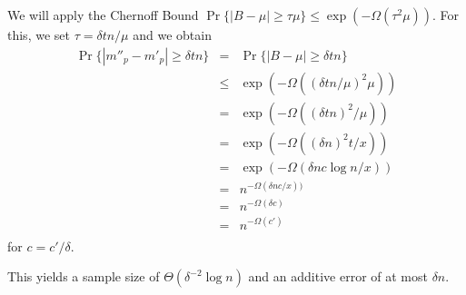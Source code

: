 \documentclass{patmorin}
\begin{document}
We will apply the Chernoff Bound $\Pr\{|B-\mu| \ge \tau\mu\} \le
\exp(-\Omega(\tau^2\mu))$.  For this, we set $\tau = \delta t n/\mu$ and we
obtain
\begin{eqnarray*}
   \Pr\{ |m''_p - m'_p| \ge \delta tn \} 
   & = & \Pr\{ |B-\mu| \ge \delta t n \} \\
   & \le & \exp(-\Omega(\left(\delta t n /\mu\right)^2 \mu)) \\
   &  = & \exp(-\Omega((\delta t n)^2/\mu)) \\
   &  = & \exp(-\Omega((\delta n)^2t/x)) \\
   &  = & \exp(-\Omega(\delta nc\log n/x)) \\
   &  = & n^{-\Omega(\delta nc/x))} \\
   &  = & n^{-\Omega(\delta c)} \\
   &  = & n^{-\Omega(c')} \\
\end{eqnarray*}
for $c=c'/\delta$.

This yields a sample size of $\Theta(\delta^{-2}\log n)$ and an additive
error of at most $\delta n$.
\end{document}
